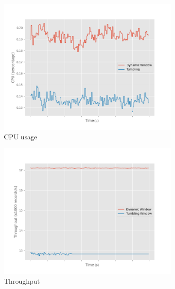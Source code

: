 \begin{figure}[htbp]
    \begin{subfigure}[b]{0.5\columnwidth}
        \includegraphics[width=\columnwidth]{fig/constant-rate/cpu_comparison.png}
        \caption{CPU usage}
        \label{fig:constant_cpu}
    \end{subfigure}
    \begin{subfigure}[b]{0.5\columnwidth}
        \includegraphics[width=\columnwidth]{fig/constant-rate/throughput_comparison.png}
        \caption{Throughput}
        \label{fig:constant_thorughput}
    \end{subfigure}
    \\
    \begin{subfigure}[b]{0.5\columnwidth}

\end{subfigure}
\end{figure}
